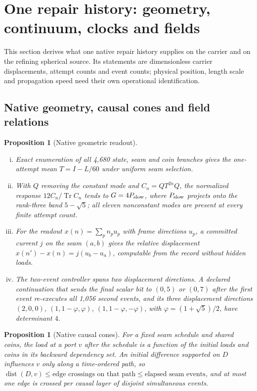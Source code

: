 \documentclass[11pt]{article}
\newtheorem{proposition}[theorem]{Proposition}
\theoremstyle{definition}
\theoremstyle{remark}
\theoremstyle{plain}
\newcommand{\Tr}{\operatorname{Tr}}
\newcommand{\dist}{\operatorname{dist}}
\begin{document}


\section{One repair history: geometry, continuum, clocks and fields}
\label{sec:native-history}
\label{sec:repair-geometry}

This section derives what one native repair history supplies on the carrier
and on the refining spherical source. Its statements are dimensionless
carrier displacements, attempt counts and event counts; physical position,
length scale and propagation speed need their own operational
identification.

\subsection{Native geometry, causal cones and field relations}
\label{sec:history-geometry}

\begin{proposition}[Native geometric readout]
\label{prop:geometry}
\begin{enumerate}[(i)]
\item Exact enumeration of all 4,680 state, seam and coin branches gives the
one-attempt mean $T=I-L/60$ under uniform seam selection.
\item With $Q$ removing the constant mode and $C_n=QT^{2n}Q$, the normalized
response $12C_n/\Tr C_n$ tends to $G=4P_{\rm slow}$, where $P_{\rm slow}$
projects onto the rank-three band $5-\sqrt5$; all eleven nonconstant modes
are present at every finite attempt count.
\item For the readout $x(n)=\sum_pn_pu_p$ with frame directions $u_p$, a
committed current $j$ on the seam $(a,b)$ gives the relative displacement
$x(n')-x(n)=j(u_b-u_a)$, computable from the record without hidden loads.
\item The two-event controller spans two displacement directions. A declared
continuation that sends the final scalar bit to $(0,5)$ or $(0,7)$ after the
first event re-executes all 1,056 second events, and its three displacement
directions $(2,0,0)$, $(1,1-\varphi,\varphi)$, $(1,1-\varphi,-\varphi)$, with
$\varphi=(1+\sqrt5)/2$, have determinant $4$.
\end{enumerate}
\end{proposition}

\begin{proposition}[Native causal cones]
\label{prop:causal}
For a fixed seam schedule and shared coins, the load at a port $v$ after the
schedule is a function of the initial loads and coins in its backward
dependency set. An initial difference supported on $D$ influences $v$ only
along a time-ordered path, so
$\dist(D,v)\le\text{edge crossings on that path}\le\text{elapsed seam events}$,
and at most one edge is crossed per causal layer of disjoint simultaneous
events.
\end{proposition}
\end{document}
